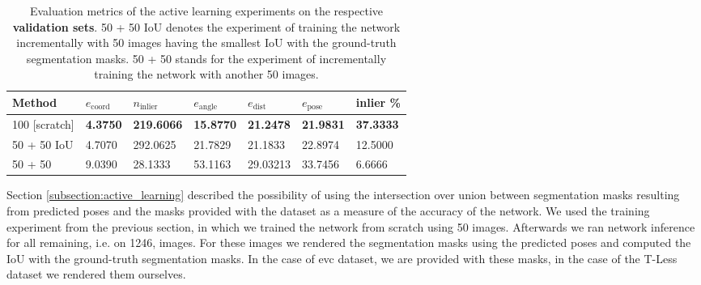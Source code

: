\begin{table}[b]
\centering
\begin{tabular}{|l||llllll|} \hline
Method            & $e_{\text{coord}}$ & $n_{\text{inlier}}$ & $e_{\text{angle}}$ & $e_{\text{dist}}$ & $e_{\text{pose}}$  & inlier \% \\ \hline \hline \rowcolor{Gray}
100 {[}scratch{]} & \textbf{4.3750}             & \textbf{219.6066}                 & \textbf{15.8770}             & \textbf{21.2478}            & \textbf{21.9831}      & \textbf{37.3333} \\ \hline
50 + 50 IoU       & 4.7070             & 292.0625                & 21.7829             & 21.1833           & 22.8974  & 12.5000 \\ \hline \rowcolor{Gray}
50 + 50           & 9.0390             & 28.1333                   & 53.1163           & 29.03213           & 33.7456  &6.6666   \\ \hline      
\end{tabular}
\caption{Evaluation metrics of the active learning experiments on the respective \textbf{validation sets}. 50 + 50 IoU denotes the experiment of training the network incrementally with 50 images having the smallest IoU with the ground-truth segmentation masks. 50 + 50 stands for the experiment of incrementally training the network with another 50 images.}
\label{table:active_learning_val}
\end{table}

Section \ref{subsection:active_learning} described the possibility of using the intersection over union between segmentation masks resulting from predicted poses and the masks provided with the dataset as a measure of the accuracy of the network. We used the training experiment from the previous section, in which we trained the network from scratch using 50 images. Afterwards we ran network inference for all remaining, i.e. on 1246, images. For these images we rendered the segmentation masks using the predicted poses and computed the IoU with the ground-truth segmentation masks. In the case of \ac{evc} dataset, we are provided with these masks, in the case of the T-Less dataset we rendered them ourselves. 

